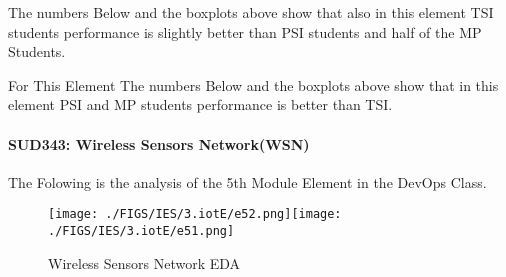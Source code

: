 \documentclass[12pt]{extreport}
\begin{document}
The numbers Below and the boxplots above show that also in this element  TSI students performance is slightly better than PSI students and half of the MP Students.

For This Element The numbers Below and the boxplots above show that in this element  PSI and MP students performance is  better than TSI.

\begin{comment}

\begin{enumerate}	
	\item The MP Class Box-Plot:
	\begin{enumerate}
		\item MAX = a {} {} {} {} {} {} {} {} UQ = b {} {} {} {} {} {} {} {} Median = c
		\item LQ = d {} {} {} {} {} {} {} {}  MIN =	l {} {} {} {} {} {} {} {}  IQR = e - f = g
	\end{enumerate}
	\item The PSI Class Box-Plot:
	\begin{enumerate}
		\item MAX = a {} {} {} {} {} {} {} {} UQ = b {} {} {} {} {} {} {} {} Median = c
		\item LQ = d {} {} {} {} {} {} {} {}  MIN =	e {} {} {} {} {} {} {} {} IQR = f - g = h	
	\end{enumerate}
	\item The TSI Class Box-Plot:
	\begin{enumerate}
		\item MAX = a {} {} {} {} {} {} {} {} UQ = b {} {} {} {} {} {} {} {} Median = c
		\item LQ = d {} {} {} {} {} {} {} {} MIN = e {} {} {} {} {} {} {} {} IQR = f - g = h	
	\end{enumerate}
\end{enumerate}

\end{comment}




\paragraph{\large SUD343: Wireless Sensors Network(WSN)\\
} 
The Folowing is the analysis of the 5th Module Element in the DevOps Class.

\begin{figure}[H]
	\centering
	\texttt{[image: ./FIGS/IES/3.iotE/e52.png]}\texttt{[image: ./FIGS/IES/3.iotE/e51.png]}
	\caption{Wireless Sensors Network EDA}
	\label{fig:34}
\end{figure}
\end{document}
